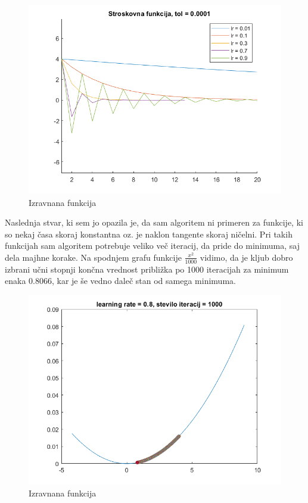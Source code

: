 \documentclass{article}
\begin{document}
\begin{figure}[!htb]
    \centering
    \includegraphics[scale=0.5]{str_fun}   
    \caption{Izravnana funkcija}
    \label{fig:foobar}
\end{figure}


\noindent Naslednja stvar, ki sem jo opazila je, da sam algoritem ni primeren za funkcije, ki so nekaj časa skoraj konstantna oz. je naklon tangente skoraj ničelni. Pri takih funkcijah sam algoritem potrebuje veliko več iteracij, da pride do minimuma, saj dela majhne korake. Na spodnjem grafu funkcije $\frac{x^2}{1000}$ vidimo, da je kljub dobro izbrani učni stopnji končna vrednost približka po 1000 iteracijah za minimum enaka 0.8066, kar je še vedno daleč stan od samega minimuma.


\begin{figure}[h]
    \centering
    \includegraphics[scale=0.5]{izravnana_fun}   
    \caption{Izravnana funkcija}
    \label{fig:foobar}
\end{figure}
\end{document}
